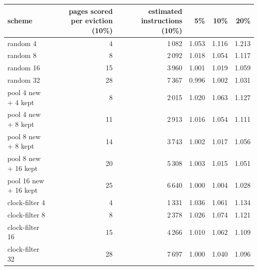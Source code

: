 \begin{tabular}{lrrrrr}
\toprule
scheme & pages scored per eviction (10\%) & estimated instructions (10\%) & 5\% & 10\% & 20\% \\
\midrule
random 4 & 4 & 1\,082 & 1.053 & 1.116 & 1.213 \\
random 8 & 8 & 2\,092 & 1.018 & 1.054 & 1.117 \\
random 16 & 15 & 3\,960 & 1.001 & 1.019 & 1.059 \\
random 32 & 28 & 7\,367 & 0.996 & 1.002 & 1.031 \\
pool 4 new + 4 kept & 8 & 2\,015 & 1.020 & 1.063 & 1.127 \\
pool 4 new + 8 kept & 11 & 2\,913 & 1.016 & 1.054 & 1.111 \\
pool 8 new + 8 kept & 14 & 3\,743 & 1.002 & 1.017 & 1.056 \\
pool 8 new + 16 kept & 20 & 5\,308 & 1.003 & 1.015 & 1.051 \\
pool 16 new + 16 kept & 25 & 6\,640 & 1.000 & 1.004 & 1.028 \\
clock-filter 4 & 4 & 1\,331 & 1.036 & 1.061 & 1.134 \\
clock-filter 8 & 8 & 2\,378 & 1.026 & 1.074 & 1.121 \\
clock-filter 16 & 15 & 4\,266 & 1.010 & 1.062 & 1.109 \\
clock-filter 32 & 28 & 7\,697 & 1.000 & 1.040 & 1.096 \\
\bottomrule
\end{tabular}
